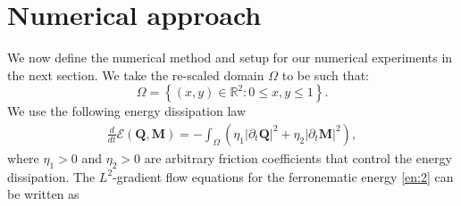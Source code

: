 \documentclass{article}
\def\Qvec{\mathbf{Q}}
\def \Mvec{\mathbf{M}}
\begin{document}
\section{Numerical approach}\label{sec:5}
We now define the numerical method and setup for our numerical experiments in the next section. We take the re-scaled domain $\Omega$ to be such that:
\[
\Omega = \left\{(x,y) \in \mathbb{R}^2: 0\leq x,y \leq 1 \right\}.
\]We use the following energy dissipation law \cite{onsager1931reciprocal}
\begin{eqnarray}\label{eq:25}
\frac{d}{dt}\mathcal{E}\left(\Qvec, \Mvec\right) = -\int_{\Omega}\left(\eta_1|\partial_t\Qvec|^2 + \eta_2|\partial_t\Mvec|^2\right),
\end{eqnarray}
where $\eta_1>0$ and $\eta_2>0$ are arbitrary friction coefficients \cite{Canevari} that control the energy dissipation. The $L^2$-gradient flow equations for the ferronematic energy \eqref{en:2} can be written as
\end{document}
